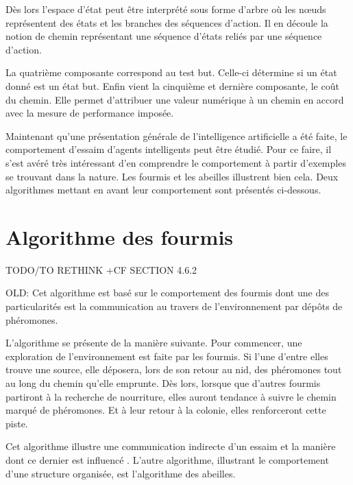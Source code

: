 Dès lors l'espace d'état peut être interprété sous forme d'arbre où les nœuds représentent des états et les branches des séquences d'action. Il en découle la notion de chemin représentant une séquence d'états reliés par une séquence d'action.

La quatrième composante correspond au test but. Celle-ci détermine si un état donné est un état but. Enfin vient la cinquième et dernière composante, le coût du chemin. Elle permet d'attribuer une valeur numérique à un chemin en accord avec la mesure de performance imposée.

Maintenant qu'une présentation générale de l'intelligence artificielle a été faite, le comportement d'essaim d'agents intelligents peut être étudié. Pour ce faire, il s'est avéré très intéressant d'en comprendre le comportement à partir d'exemples se trouvant dans la nature. Les fourmis et les abeilles illustrent bien cela. Deux algorithmes mettant en avant leur comportement sont présentés ci-dessous.

\section{Algorithme des fourmis}

TODO/TO RETHINK +CF SECTION 4.6.2

OLD:
Cet algorithme est basé sur le comportement des fourmis dont une des particularités est la communication au travers de l'environnement par dépôts de phéromones.

L'algorithme se présente de la manière suivante. Pour commencer, une exploration de l'environnement est faite par les fourmis. Si l'une d'entre elles trouve une source, elle déposera, lors de son retour au nid, des phéromones tout au long du chemin qu'elle emprunte. Dès lors, lorsque que d'autres fourmis partiront à la recherche de nourriture, elles auront tendance à suivre le chemin  marqué de phéromones. Et à leur retour à la colonie, elles renforceront cette piste.

Cet algorithme illustre une communication indirecte d'un essaim et la manière dont ce dernier est influencé \cite{antOpti}. L'autre algorithme, illustrant le comportement d'une structure organisée, est l'algorithme des abeilles.
